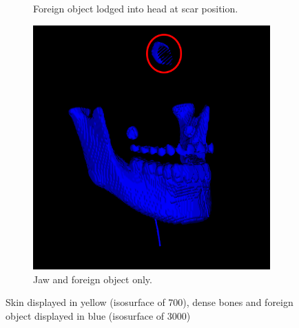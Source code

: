 \documentclass{article}
\begin{document}
\begin{figure}[h]
\begin{subfigure}[b]{0.3\textwidth}
			\caption{Foreign object lodged into head at scar position.}
			\label{fig:skull1}
	\end{subfigure}
	\quad
	\begin{subfigure}[b]{0.3\textwidth}
		\includegraphics[width=\textwidth]{jaw}
			\caption{Jaw and foreign object only.}
			\label{fig:jaw}
	\end{subfigure}
	\caption{Skin displayed in yellow (isosurface of 700), dense bones and
	foreign object displayed in blue (isosurface of 3000)}\label{fig:skulls}
\end{figure}
\end{document}

